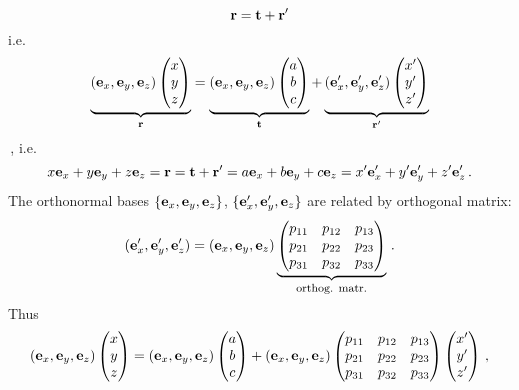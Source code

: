 \documentclass[12pt]{article}
\numberwithin{equation}{section}
\begin{document}
  \begin{equation*}
  {\bf r}={\bf t}+{\bf r}'  
  \end{equation*}
i.e.
 \begin{equation*}
      \underbrace
            {
  ({\bf e}_x,{\bf e}_y,{\bf e}_z)
  \begin{pmatrix}
         x \cr
        y\cr
        z\cr
   \end{pmatrix}
     }_{{\bf r}}
            =
        \underbrace
         {
  ({\bf e}_x,{\bf e}_y,{\bf e}_z)
      \begin{pmatrix}
         a \cr
        b\cr
         c\cr
   \end{pmatrix}
          }_{\bf  t}
          +
      \underbrace
         {
  ({\bf e}'_x,{\bf e}'_y,{\bf e}'_z)
      \begin{pmatrix}
         x' \cr
        y'\cr
        z'
   \end{pmatrix}
          }_{\bf {\bf r}'}
\end{equation*}\,,
i.e.
  \begin{equation*}
  x{\bf e}_x+y{\bf e}_y+z{\bf e}_z={\bf r}=
{\bf t}+{\bf r}'=a{\bf e}_x+b{\bf e}_y+c{\bf e}_z=
     x'{\bf e}'_x+y'{\bf e}'_y+z'{\bf e}'_z\,.
  \end{equation*}
The orthonormal 
bases $\{{\bf e}_x,{\bf e}_y,{\bf e}_z\}$, $\{{\bf e}'_x,{\bf e}'_y,{\bf e}_z\}$
are related by orthogonal matrix:
      \begin{equation*}
  ({\bf e}'_x,{\bf e}'_y,{\bf e}'_z)=({\bf e}_x,{\bf e}_y,{\bf e}_z)
\underbrace
        {
     \begin{pmatrix}
    p_{11} &p_{12} &p_{13}\cr
    p_{21} &p_{22} &p_{23}\cr
    p_{31} &p_{32} &p_{33}\cr
\end{pmatrix}
     }_{\hbox {\footnotesize orthog. matr.}}\,.
    \end{equation*}
Thus
 \begin{equation*}
  ({\bf e}_x,{\bf e}_y,{\bf e}_z)
  \begin{pmatrix}
         x \cr
        y\cr
            z\cr
   \end{pmatrix}
=  ({\bf e}_x,{\bf e}_y,{\bf e}_z)
  \begin{pmatrix}
         a \cr
        b\cr
        c\cr
   \end{pmatrix}
              +  
 ({\bf e}_x,{\bf e}_y,{\bf e}_z)
      \begin{pmatrix}
    p_{11} &p_{12} &p_{13}\cr
    p_{21} &p_{22} &p_{23}\cr
    p_{31} &p_{32} &p_{33}\cr
         \end{pmatrix}
           \begin{pmatrix}
         x'\cr
        y'\cr
           z'\cr
   \end{pmatrix}\,,
\end{equation*}
\end{document}
